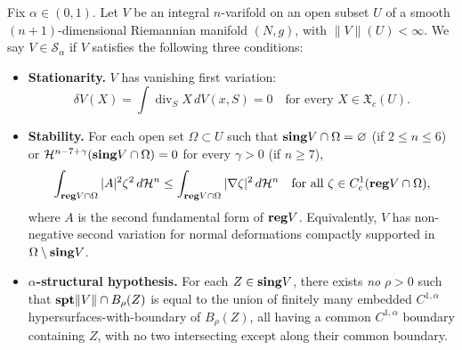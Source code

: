 \begin{definition}\label{defn:class-S-alpha}
Fix $\alpha \in (0, 1)$. Let $V$ be an integral $n$-varifold on an open subset $U$ of a smooth $(n+1)$-dimensional Riemannian manifold $(N, g)$, with $\|V\|(U) < \infty$. We say $V \in \mathcal{S}_\alpha$ if $V$ satisfies the following three conditions:
\begin{itemize}
\item[$(\mathcal{S}1)$] \textbf{Stationarity.} $V$ has vanishing first variation:
\[
    \delta V(X) = \int \operatorname{div}_S X \, dV(x, S) = 0 \quad \text{for every } X \in \mathfrak{X}_c(U).
\]

\item[$(\mathcal{S}2)$] \textbf{Stability.} For each open set $\Omega \subset U$ such that $\mathbf{sing} V \cap \Omega = \varnothing$ (if $2 \leq n \leq 6$) or $\mathcal{H}^{n-7+\gamma}(\mathbf{sing} V \cap \Omega) = 0$ for every $\gamma > 0$ (if $n \geq 7$),
\[
    \int_{\mathbf{reg} V \cap \Omega} |A|^2 \zeta^2 \, d\mathcal{H}^n \leq \int_{\mathbf{reg} V \cap \Omega} |\nabla \zeta|^2 \, d\mathcal{H}^n \quad \text{for all } \zeta \in C^1_c(\mathbf{reg} V \cap \Omega),
\]
where $A$ is the second fundamental form of $\mathbf{reg} V$. Equivalently, $V$ has non-negative second variation for normal deformations compactly supported in $\Omega \setminus \mathbf{sing} V$.

\item[$(\mathcal{S}3)$] \textbf{$\alpha$-structural hypothesis.}\label{defn:alpha-structural} For each $Z \in \mathbf{sing} V$, there exists \emph{no} $\rho > 0$ such that $\mathbf{spt}\|V\| \cap B_\rho(Z)$ is equal to the union of finitely many embedded $C^{1,\alpha}$ hypersurfaces-with-boundary of $B_\rho(Z)$, all having a common $C^{1,\alpha}$ boundary containing $Z$, with no two intersecting except along their common boundary.
\end{itemize}
\end{definition}

